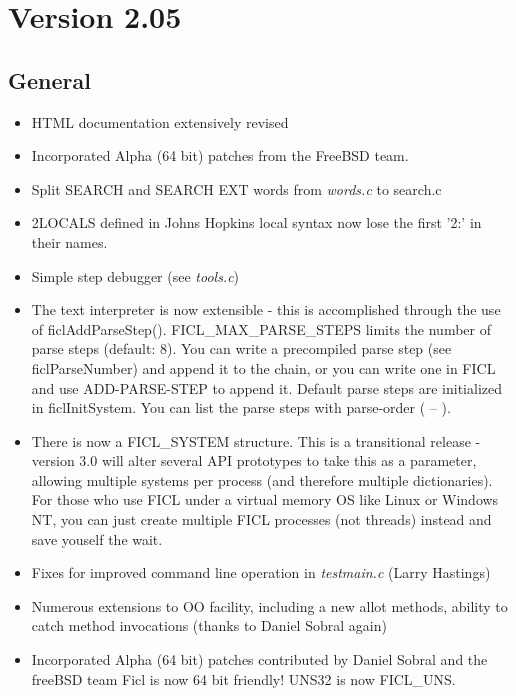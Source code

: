 \section*{Version 2.05}
\subsection*{General}
\begin{itemize}[noitemsep]
	\item HTML documentation extensively revised

	\item Incorporated Alpha (64 bit) patches from the FreeBSD team.

	\item Split SEARCH and SEARCH EXT words from \textit{words.c}
	to search.c

	\item 2LOCALS defined in Johns Hopkins local syntax now lose the
	first '2:' in their names.

	\item Simple step debugger (see \textit{tools.c})

	\item The text interpreter is now extensible - this is
	accomplished through the use of ficlAddParseStep().
	FICL\_MAX\_PARSE\_STEPS limits the number of parse steps
	(default: 8). You can write a precompiled parse step (see
	ficlParseNumber) and append it to the chain, or you can write
	one in FICL and use ADD-PARSE-STEP to append it. Default parse
	steps are initialized in ficlInitSystem. You can list the parse
	steps with parse-order ( -- ).

	\item There is now a FICL\_SYSTEM structure. This is a
	transitional release - version 3.0 will alter several API
	prototypes to take this as a parameter, allowing multiple
	systems per process (and therefore multiple dictionaries). For
	those who use FICL under a virtual memory OS like Linux or
	Windows NT, you can just create multiple FICL processes (not
	threads) instead and save youself the wait.

	\item Fixes for improved command line operation in
	\textit{testmain.c} (Larry Hastings)

	\item Numerous extensions to OO facility, including a new allot
	methods, ability to catch method invocations (thanks to Daniel
	Sobral again)

	\item Incorporated Alpha (64 bit) patches contributed by Daniel
	Sobral and the freeBSD team Ficl is now 64 bit friendly! UNS32
	is now FICL\_UNS.


\end{itemize}
